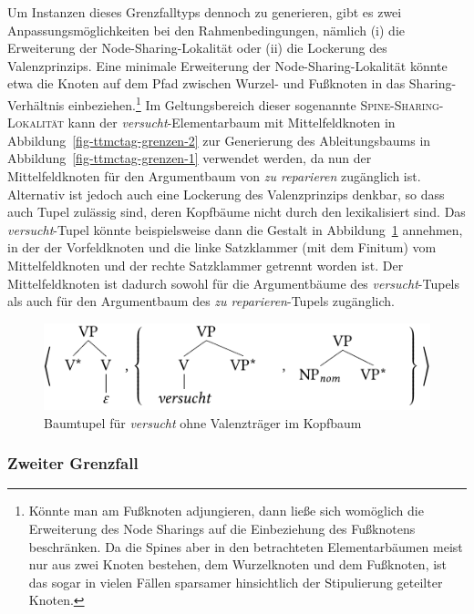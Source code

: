 Um Instanzen dieses Grenzfalltyps dennoch zu generieren, gibt es zwei Anpassungsmöglichkeiten bei den Rahmenbedingungen, nämlich (i) die Erweiterung der Node-Sharing-Lokalität oder (ii) die Lockerung des Valenzprinzips. Eine minimale Erweiterung der Node-Sharing-Lokalität könnte etwa die Knoten auf dem Pfad zwischen Wurzel- und Fu\ss knoten in das Sharing-Verhältnis einbeziehen.\footnote{Könnte man am Fu\ss knoten adjungieren, dann lie\ss e sich womöglich die Erweiterung des Node Sharings auf die Einbeziehung des Fu\ss knotens beschränken. Da die Spines aber in den betrachteten Elementarbäumen meist nur aus zwei Knoten bestehen, dem Wurzelknoten und dem Fu\ss knoten, ist das  sogar in vielen Fällen sparsamer hinsichtlich der Stipulierung geteilter Knoten.} Im Geltungsbereich dieser sogenannte \textsc{Spine-Sharing-Lokalität} kann der {\it versucht}-Elementarbaum mit Mittelfeldknoten in Abbildung~\ref{fig-ttmctag-grenzen-2} zur Generierung des Ableitungsbaums in Abbildung~\ref{fig-ttmctag-grenzen-1} verwendet werden, da nun der Mittelfeldknoten für den Argumentbaum von {\it zu reparieren} zugänglich ist. Alternativ ist jedoch auch eine Lockerung des Valenzprinzips denkbar, so dass auch Tupel zulässig sind, deren Kopfbäume nicht durch den  lexikalisiert sind. Das {\it versucht}-Tupel könnte beispielsweise dann die Gestalt in Abbildung~\ref{fig-ttmctag-grenzen-1-2} annehmen, in der der Vorfeldknoten und die linke Satzklammer (mit dem Finitum) vom Mittelfeldknoten und der rechte Satzklammer getrennt worden ist. Der Mittelfeldknoten ist dadurch sowohl für die Argumentbäume des {\it versucht}-Tupels als auch für den Argumentbaum des {\it zu reparieren}-Tupels zugänglich. 

\begin{figure}[t]
\centering
\includegraphics{graphics/abb730.pdf}
\caption{\label{fig-ttmctag-grenzen-1-2}Baumtupel für {\it versucht} ohne Valenzträger im Kopfbaum}
\end{figure}   


\subsubsection{Zweiter Grenzfall}

